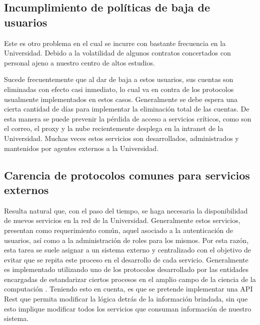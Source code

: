 \subsection{Incumplimiento de políticas de baja de usuarios}

Este es otro problema en el cual se incurre con bastante frecuencia en la Universidad. 
Debido a la volatilidad de algunos contratos concertados con personal ajeno a nuestro 
centro de altos estudios. 

Sucede frecuentemente que al dar de baja a estos usuarios, sus cuentas son eliminadas con 
efecto casi inmediato, lo cual va en contra de los protocolos usualmente implementados en 
estos casos. Generalmente se debe espera una cierta cantidad de días para implementar la 
eliminación total de las cuentas. De esta manera se puede prevenir la pérdida de acceso a 
servicios críticos, como son el correo, el proxy y la nube recientemente desplega en la 
intranet de la Universidad. Muchas veces estos servicios son desarrollados, administrados 
y mantenidos por agentes externos a la Universidad. 


\subsection{Carencia de protocolos comunes para servicios externos}

Resulta natural que, con el paso del tiempo, se haga necesaria la disponibilidad de nuevos 
servicios en la red de la Universidad. Generalmente estos servicios, presentan como 
requerimiento común, aquel asociado a la autenticación de usuarios, así como a la 
administración de roles para los mismos. Por esta razón, esta tarea se suele asignar a un 
sistema externo y centralizado con el objetivo de evitar que se repita este 
proceso en el desarrollo de cada servicio. Generalmente es implementado utilizando uno de 
los protocolos desarrollado por las entidades encargadas de estandarizar ciertos procesos 
en el amplio campo de la ciencia de la computación  . Teniendo esto en cuenta, es que se 
pretende implementar una API Rest que permita modificar la lógica detrás de la 
información brindada, sin que esto implique modificar todos los servicios que consuman 
información de nuestro sistema.







